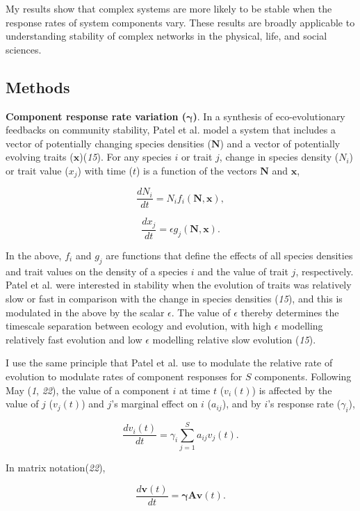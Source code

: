 \documentclass[]{article}
\begin{document}
My results show that complex systems are more likely to be stable when
the response rates of system components vary. These results are broadly
applicable to understanding stability of complex networks in the
physical, life, and social sciences.

\subsection{Methods}\label{methods}

\textbf{Component response rate variation (\(\mathbf{\gamma}\))}. In a
synthesis of eco-evolutionary feedbacks on community stability, Patel et
al. model a system that includes a vector of potentially changing
species densities (\(\mathbf{N}\)) and a vector of potentially evolving
traits (\(\mathbf{x}\))(\emph{15}). For any species \(i\) or trait
\(j\), change in species density (\(N_{i}\)) or trait value (\(x_{j}\))
with time (\(t\)) is a function of the vectors \(\mathbf{N}\) and
\(\mathbf{x}\),

\[\frac{dN_{i}}{dt} = N_{i}f_{i}(\mathbf{N}, \mathbf{x}),\]

\[\frac{dx_{j}}{dt} = \epsilon g_{j}(\mathbf{N}, \mathbf{x}).\]

In the above, \(f_{i}\) and \(g_{j}\) are functions that define the
effects of all species densities and trait values on the density of a
species \(i\) and the value of trait \(j\), respectively. Patel et al.
were interested in stability when the evolution of traits was relatively
slow or fast in comparison with the change in species densities
(\emph{15}), and this is modulated in the above by the scalar
\(\epsilon\). The value of \(\epsilon\) thereby determines the timescale
separation between ecology and evolution, with high \(\epsilon\)
modelling relatively fast evolution and low \(\epsilon\) modelling
relative slow evolution (\emph{15}).

I use the same principle that Patel et al. use to modulate the relative
rate of evolution to modulate rates of component responses for \(S\)
components. Following May (\emph{1}, \emph{22}), the value of a
component \(i\) at time \(t\) (\(v_{i}(t)\)) is affected by the value of
\(j\) (\(v_{j}(t)\)) and \(j\)'s marginal effect on \(i\) (\(a_{ij}\)),
and by \(i\)'s response rate (\(\gamma_{i}\)),

\[\frac{dv_{i}(t)}{dt} = \gamma_{i} \sum_{j=1}^{S}a_{ij}v_{j}(t).\]

In matrix notation(\emph{22}),

\[\frac{d\mathbf{v}(t)}{dt} = \mathbf{\gamma} \mathbf{A}\mathbf{v}(t).\]
\end{document}
